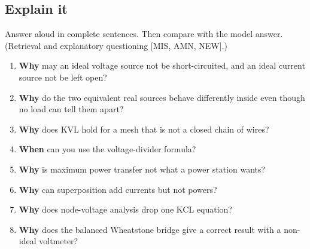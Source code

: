 \documentclass[11pt]{article}
\begin{document}
\begin{keepsection}
\section{Explain it}

Answer aloud in complete sentences. Then compare with the model answer. (Retrieval and explanatory questioning [MIS, AMN, NEW].)

\begin{enumerate}
\item \textbf{Why} may an ideal voltage source not be short-circuited, and an ideal current source not be left open?
\item \textbf{Why} do the two equivalent real sources behave differently inside even though no load can tell them apart?
\item \textbf{Why} does KVL hold for a mesh that is not a closed chain of wires?
\item \textbf{When} can you use the voltage-divider formula?
\item \textbf{Why} is maximum power transfer not what a power station wants?
\item \textbf{Why} can superposition add currents but not powers?
\item \textbf{Why} does node-voltage analysis drop one KCL equation?
\item \textbf{Why} does the balanced Wheatstone bridge give a correct result with a non-ideal voltmeter?
\end{enumerate}

\end{keepsection}

\clearpage
\end{document}
